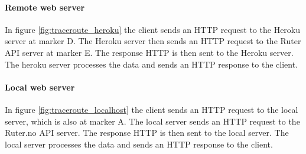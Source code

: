 \documentclass[10pt,a4paper]{article}
\begin{document}
\paragraph{Remote web server}
In figure \ref{fig:traceroute_heroku} the client sends an HTTP request to the Heroku server at marker D. The Heroku server then sends an HTTP request to the Ruter API server at marker E. The response HTTP is then sent to the Heroku server. The heroku server processes the data and sends an HTTP response to the client.
\paragraph{Local web server}
In figure \ref{fig:traceroute_localhost} the client sends an HTTP request to the local server, which is also at marker A. The local server sends an HTTP request to the Ruter.no API server. The response HTTP is then sent to the local server. The local server processes the data and sends an HTTP response to the client.
\end{document}
